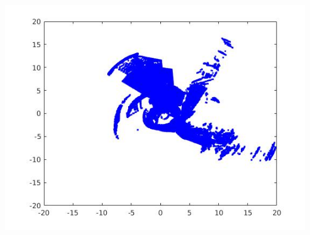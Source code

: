 \documentclass[english]{article}
\begin{document}
\includegraphics[scale=0.8]{map3dead.jpg}\\
\end{document}
